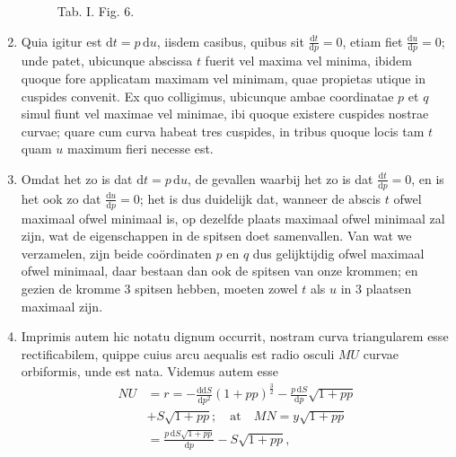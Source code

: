 \documentclass[10pt,a4paper]{article}
\newcommand{\switchenum}{\setcounter{enumi}{\arabic{enumi}-1}\switchcolumn}
\def\D{\mathrm{d}}
\begin{document}
\begin{paracol}{2}
\begin{enumerate}[topsep=1px]
\begin{figure}[h]
{}
			\selectfont
			\caption{Tab. I. Fig. 6.}
		\end{figure}


		\switchcolumn*
		
		\item Quia igitur est $\D t=p \,\D u$, iisdem casibus, quibus sit $\frac{\D t}{\D p}=0$, etiam fiet $\frac{\D u}{\D p}= 0$; unde patet, ubicunque abscissa $t$ fuerit vel maxima vel minima, ibidem quoque fore applicatam maximam vel minimam, quae propietas utique in cuspides convenit. Ex quo colligimus, ubicunque ambae coordinatae $p$ et $q$ simul fiunt vel maximae vel minimae, ibi quoque existere cuspides nostrae curvae; quare cum curva habeat tres cuspides, in tribus quoque locis tam $t$ quam $u$ maximum fieri necesse est.
		
		\switchenum
		\item Omdat het zo is dat $\D t=p\, \D u$, de gevallen waarbij het zo is dat $\frac{\D t}{\D p}=0$, en is het ook zo dat $\frac{\D u}{\D p}= 0$; het is dus duidelijk dat, wanneer de abscis $t$ ofwel maximaal ofwel minimaal is, op dezelfde plaats maximaal ofwel minimaal zal zijn, wat de eigenschappen in de spitsen doet samenvallen. Van wat we verzamelen, zijn beide coördinaten $p$ en $q$ dus gelijktijdig ofwel maximaal ofwel minimaal, daar bestaan dan ook de spitsen van onze krommen; en gezien de kromme 3 spitsen hebben, moeten zowel $t$ als $u$ in 3 plaatsen maximaal zijn.



		\switchcolumn*
		
		\item Imprimis autem hic notatu dignum occurrit, nostram curva triangularem esse rectificabilem, quippe cuius arcu aequalis est radio osculi $MU$ curvae orbiformis, unde est nata. Videmus autem esse
		\begin{align*}
			NU &= r = -\frac{\D \D S}{\D p^2}(1+pp)^\frac{3}{2}-\frac{p\,\D S}{\D p}\sqrt{1+pp}\\
			& +S\sqrt{1+pp}; \quad \text{at} \quad MN = y\sqrt{1+pp}\\
			&= \frac{p\, \D S\sqrt{1+pp}}{\D p}-S\sqrt{1+pp},
		\end{align*}
		

\end{enumerate}
\end{paracol}
\end{document}
